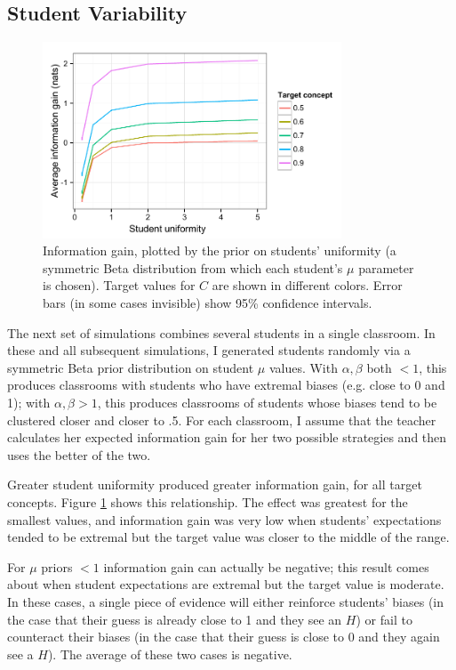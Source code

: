 \documentclass[10pt,letterpaper]{article}
\begin{document}
\subsection{Student Variability}

\begin{figure}[t]
\begin{center}
\includegraphics[width=3.5in]{figures/student_uniformity.pdf}
\end{center}
\caption{\label{fig:uniformity} Information gain, plotted by the prior on students' uniformity (a symmetric Beta distribution from which each student's $\mu$ parameter is chosen). Target values for $C$ are shown in different colors. Error bars (in some cases invisible) show 95\% confidence intervals.}
\end{figure}

The next set of simulations combines several students in a single classroom. In these and all subsequent simulations, I generated students randomly via a symmetric Beta prior distribution on student $\mu$ values. With $\alpha,\beta$ both $< 1$, this produces classrooms with students who have extremal biases (e.g. close to 0 and 1); with $\alpha,\beta>1$, this produces classrooms of students whose biases tend to be clustered closer and closer to .5. For each classroom, I assume that the teacher calculates her expected information gain for her two possible strategies and then uses the better of the two. 

Greater student uniformity produced greater information gain, for all target concepts. Figure \ref{fig:uniformity} shows this relationship. The effect was greatest for the smallest values, and information gain was very low when students' expectations tended to be extremal but the target value was closer to the middle of the range. 

For $\mu$ priors $< 1$ information gain can actually be negative; this result comes about when student expectations are extremal but the target value is moderate. In these cases, a single piece of evidence will either reinforce students' biases (in the case that their guess is already close to 1 and they see an $H$) or fail to counteract their biases (in the case that their guess is close to 0 and they again see a $H$). The average of these two cases is negative.
\end{document}
